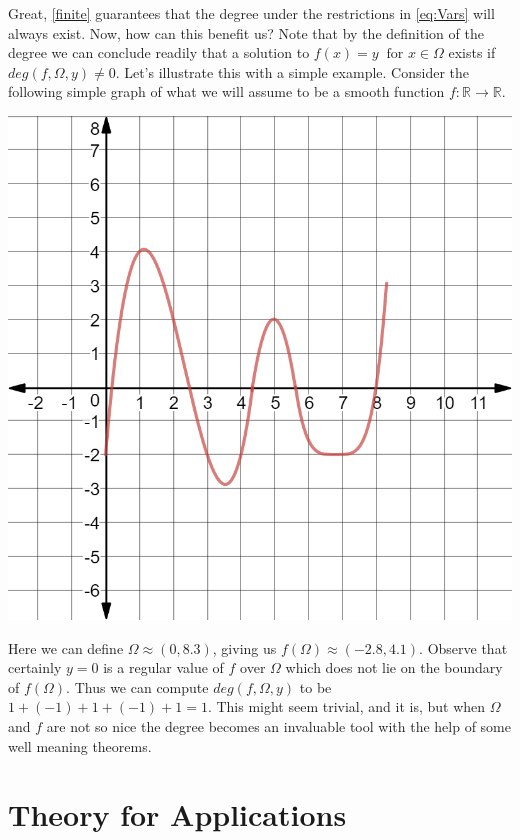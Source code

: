 \documentclass[11pt]{article}
\theoremstyle{plain}
\theoremstyle{definition}
\theoremstyle{remark}
\begin{document}
Great, \cref{finite} guarantees that the degree under the restrictions in \eqref{eq:Vars} will always exist. Now, how can this benefit us?
Note that by the definition of the degree we can conclude readily that a solution to $f(x)=y \ \text{ for } x\in\Omega$ exists if $deg\left(f,\Omega,y\right)\neq 0$. Let's illustrate this with a simple example. Consider the following simple graph of what we will assume to be a smooth function $f:\mathbb{R}\rightarrow\mathbb{R}$. 
\begin{center}
\includegraphics[scale=0.25]{Figures/Curve1}
\end{center}

Here we can define $\Omega\approx (0,8.3)$, giving us $f(\Omega)\approx (-2.8,4.1)$. Observe that certainly $y=0$ is a regular value of $f$ over $\Omega$ which does not lie on the boundary of $f(\Omega)$. Thus we can compute $deg\left(f,\Omega,y\right)$ to be $1+(-1)+1+(-1)+1=1$. This might seem trivial, and it is, but when $\Omega$ and $f$ are not so nice the degree becomes an invaluable tool with the help of some well meaning theorems. 

\newpage

\section{Theory for Applications}
\end{document}
